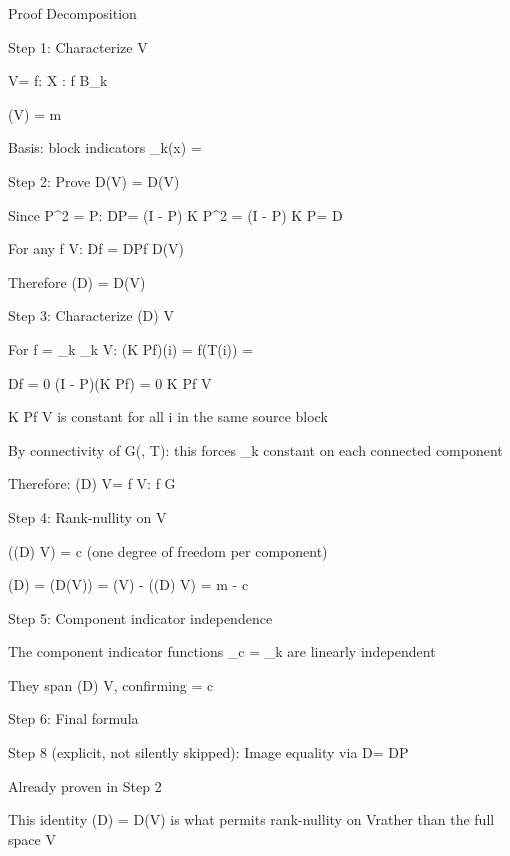 Proof Decomposition

Step 1: Characterize V\Pi

V\Pi = {f: X \to {} : f  B_k}

\dim(V\Pi) = m

Basis: block indicators \chi_k(x) = 


Step 2: Prove D\Pi(V) = D\Pi(V\Pi)

Since P\Pi^2 = P\Pi: D\Pi P\Pi = (I - P\Pi) K P\Pi^2 = (I - P\Pi) K P\Pi = D\Pi

For any f \in V: D\Pi f = D\Pi P\Pi f \in D\Pi(V\Pi)

Therefore (D\Pi) = D\Pi(V\Pi)


Step 3: Characterize \ker(D\Pi) \cap V\Pi

For f = \sum \alpha_k \chi_k \in V\Pi: (K P\Pi f)(i) = f(T(i)) = 

D\Pi f = 0 \iff (I - P\Pi)(K P\Pi f) = 0 \iff K P\Pi f \in V\Pi

K P\Pi f \in V\Pi \iff {} is constant for all i in the same source block

By connectivity of G(\Pi, T): this forces \alpha_k constant on each connected component

Therefore: \ker(D\Pi) \cap V\Pi = {f \in V\Pi : f  G}


Step 4: Rank-nullity on V\Pi

\dim(\ker(D\Pi) \cap V\Pi) = c{} (one degree of freedom per component)

(D\Pi) = \dim(D\Pi(V\Pi)) = \dim(V\Pi) - \dim(\ker(D\Pi) \cap V\Pi) = m - c{}


Step 5: Component indicator independence

The component indicator functions \eta_c =  \chi_k are linearly independent

They span \ker(D\Pi) \cap V\Pi, confirming \dim = c{}


Step 6: Final formula

Step 8 (explicit, not silently skipped): Image equality via D\Pi = D\Pi P\Pi

Already proven in Step 2

This identity (D\Pi) = D\Pi(V\Pi) is what permits rank-nullity on V\Pi rather than the full space V




